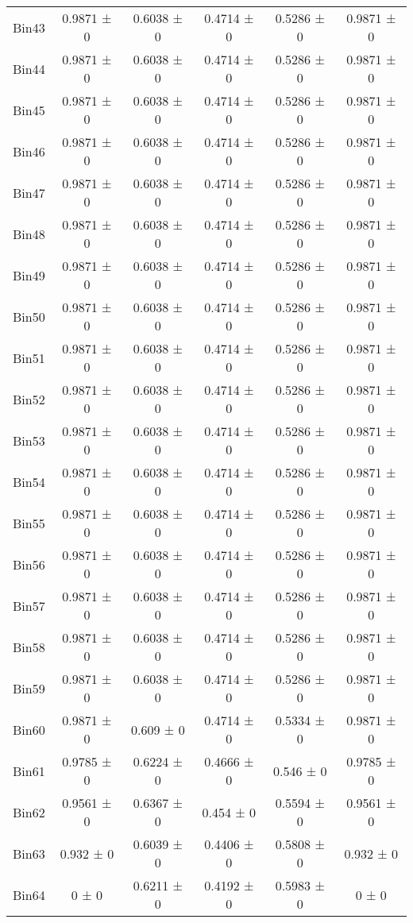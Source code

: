\begin{tabular}{@{\extracolsep{4pt}}lccccc@{}}
     Bin43 & 0.9871 ± 0 & 0.6038 ± 0 & 0.4714 ± 0 & 0.5286 ± 0 & 0.9871 ± 0 \\ 
     Bin44 & 0.9871 ± 0 & 0.6038 ± 0 & 0.4714 ± 0 & 0.5286 ± 0 & 0.9871 ± 0 \\ 
     Bin45 & 0.9871 ± 0 & 0.6038 ± 0 & 0.4714 ± 0 & 0.5286 ± 0 & 0.9871 ± 0 \\ 
     Bin46 & 0.9871 ± 0 & 0.6038 ± 0 & 0.4714 ± 0 & 0.5286 ± 0 & 0.9871 ± 0 \\ 
     Bin47 & 0.9871 ± 0 & 0.6038 ± 0 & 0.4714 ± 0 & 0.5286 ± 0 & 0.9871 ± 0 \\ 
     Bin48 & 0.9871 ± 0 & 0.6038 ± 0 & 0.4714 ± 0 & 0.5286 ± 0 & 0.9871 ± 0 \\ 
     Bin49 & 0.9871 ± 0 & 0.6038 ± 0 & 0.4714 ± 0 & 0.5286 ± 0 & 0.9871 ± 0 \\ 
     Bin50 & 0.9871 ± 0 & 0.6038 ± 0 & 0.4714 ± 0 & 0.5286 ± 0 & 0.9871 ± 0 \\ 
     Bin51 & 0.9871 ± 0 & 0.6038 ± 0 & 0.4714 ± 0 & 0.5286 ± 0 & 0.9871 ± 0 \\ 
     Bin52 & 0.9871 ± 0 & 0.6038 ± 0 & 0.4714 ± 0 & 0.5286 ± 0 & 0.9871 ± 0 \\ 
     Bin53 & 0.9871 ± 0 & 0.6038 ± 0 & 0.4714 ± 0 & 0.5286 ± 0 & 0.9871 ± 0 \\ 
     Bin54 & 0.9871 ± 0 & 0.6038 ± 0 & 0.4714 ± 0 & 0.5286 ± 0 & 0.9871 ± 0 \\ 
     Bin55 & 0.9871 ± 0 & 0.6038 ± 0 & 0.4714 ± 0 & 0.5286 ± 0 & 0.9871 ± 0 \\ 
     Bin56 & 0.9871 ± 0 & 0.6038 ± 0 & 0.4714 ± 0 & 0.5286 ± 0 & 0.9871 ± 0 \\ 
     Bin57 & 0.9871 ± 0 & 0.6038 ± 0 & 0.4714 ± 0 & 0.5286 ± 0 & 0.9871 ± 0 \\ 
     Bin58 & 0.9871 ± 0 & 0.6038 ± 0 & 0.4714 ± 0 & 0.5286 ± 0 & 0.9871 ± 0 \\ 
     Bin59 & 0.9871 ± 0 & 0.6038 ± 0 & 0.4714 ± 0 & 0.5286 ± 0 & 0.9871 ± 0 \\ 
     Bin60 & 0.9871 ± 0 & 0.609 ± 0 & 0.4714 ± 0 & 0.5334 ± 0 & 0.9871 ± 0 \\ 
     Bin61 & 0.9785 ± 0 & 0.6224 ± 0 & 0.4666 ± 0 & 0.546 ± 0 & 0.9785 ± 0 \\ 
     Bin62 & 0.9561 ± 0 & 0.6367 ± 0 & 0.454 ± 0 & 0.5594 ± 0 & 0.9561 ± 0 \\ 
     Bin63 & 0.932 ± 0 & 0.6039 ± 0 & 0.4406 ± 0 & 0.5808 ± 0 & 0.932 ± 0 \\ 
     Bin64 & 0 ± 0 & 0.6211 ± 0 & 0.4192 ± 0 & 0.5983 ± 0 & 0 ± 0 \\ 

\end{tabular}
